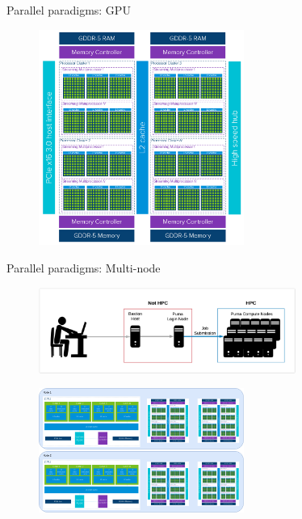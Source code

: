 \documentclass[dvipsnames,pdf,9pt]{beamer}
\newcommand{\<}{\langle}
\renewcommand{\>}{\rangle}
\begin{document}
\begin{frame}[fragile]{Parallel paradigms: GPU}
  \begin{figure}
    \centering
    \includegraphics[width=0.6\textwidth]{./gpuArchitecture.png}
  \end{figure}
  \let\thefootnote\relax{}
\end{frame}

\begin{frame}[fragile]{Parallel paradigms: Multi-node}
  \begin{figure}
    \centering
    \includegraphics[width=0.75\textwidth]{./hpcArchitecture.png}
  \end{figure}
  \begin{figure}
    \centering
    \includegraphics[width=0.6\textwidth]{./multi-node.png}
  \end{figure}
  \let\thefootnote\relax{}
\end{frame}
\end{document}

